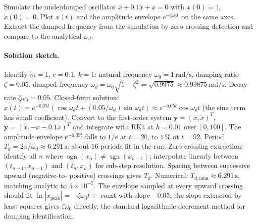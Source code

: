 \begin{exercise}
Simulate the underdamped oscillator $\ddot{x} + 0.1 \dot{x} + x =
0$ with $x(0) = 1$, $\dot{x}(0) = 0$. Plot $x(t)$ and the
amplitude envelope $e^{-\zeta\omega_{0} t}$ on the same axes.
Extract the damped frequency from the simulation by zero-crossing
detection and compare to the analytical $\omega_{d}$.

\paragraph{Solution sketch.} Identify $m = 1$, $c = 0.1$, $k = 1$:
natural frequency $\omega_{0} = 1\,\si{\radian\per\second}$,
damping ratio $\zeta = 0.05$, damped frequency $\omega_{d} =
\omega_{0}\sqrt{1 - \zeta^{2}} = \sqrt{0.9975} \approx 0.99875\,
\si{\radian\per\second}$. Decay rate $\zeta \omega_{0} = 0.05$.
Closed-form solution: $x(t) = e^{-0.05 t}(\cos\omega_{d} t +
(0.05/\omega_{d}) \sin\omega_{d} t) \approx e^{-0.05 t} \cos
\omega_{d} t$ (the sine term has small coefficient). Convert to
the first-order system $\mathbf{y} = (x, \dot{x})^{T}$,
$\dot{\mathbf{y}} = (\dot{x}, -x - 0.1 \dot{x})^{T}$ and integrate
with RK4 at $h = 0.01$ over $[0, 100]$. The amplitude envelope
$e^{-0.05 t}$ falls to $1/e$ at $t = 20$, to $1\,\%$ at $t = 92$.
Period $T_{d} = 2\pi/\omega_{d} \approx 6.291\,\si{\second}$;
about $16$ periods fit in the run. Zero-crossing extraction:
identify all $n$ where $\operatorname{sgn}(x_{n}) \neq
\operatorname{sgn}(x_{n-1})$; interpolate linearly between
$(t_{n-1}, x_{n-1})$ and $(t_{n}, x_{n})$ for sub-step
resolution. Spacing between successive upward (negative-to-
positive) crossings gives $T_{d}$. Numerical: $T_{d, \text{num}}
\approx 6.291\,\si{\second}$, matching analytic to $5 \times
10^{-5}$. The envelope sampled at every upward crossing should
fit $\ln |x_{\text{peak}}| = -\zeta \omega_{0} t + $ const with
slope $-0.05$; the slope extracted by least squares gives
$\zeta \omega_{0}$ directly, the standard logarithmic-decrement
method for damping identification.
\end{exercise}

